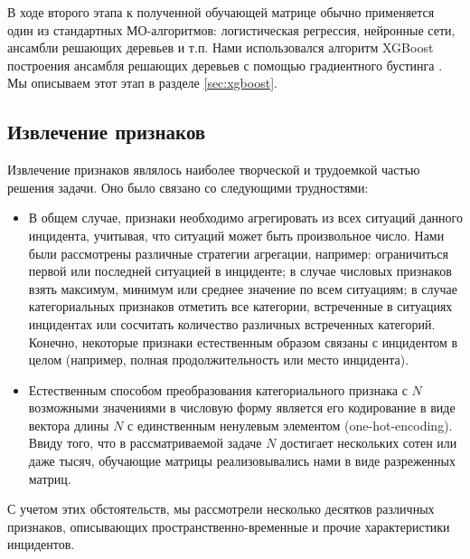 В ходе второго этапа к полученной обучающей матрице обычно применяется один из стандартных МО-алгоритмов: логистическая регрессия, нейронные сети, ансамбли решающих деревьев и т.п. Нами использовался алгоритм XGBoost построения ансамбля решающих деревьев с помощью градиентного бустинга \cite{chen2016xgboost}. Мы описываем этот этап в разделе \ref{sec:xgboost}.  

\subsection{Извлечение признаков}\label{sec:feature_extraction}
Извлечение признаков являлось наиболее творческой и трудоемкой частью решения задачи. Оно было связано со следующими трудностями:
\begin{itemize}
\item В общем случае, признаки необходимо агрегировать из всех ситуаций данного инцидента, учитывая, что ситуаций может быть произвольное число. Нами были рассмотрены различные стратегии агрегации, например: ограничиться первой или последней ситуацией в инциденте; в случае числовых признаков взять максимум, минимум или среднее значение по всем ситуациям; в случае категориальных признаков отметить все категории, встреченные в ситуациях инцидентах или сосчитать количество различных встреченных категорий. Конечно, некоторые признаки естественным образом связаны с инцидентом в целом (например, полная продолжительность или место инцидента).
\item Естественным способом преобразования категориального признака с $N$ возможными значениями в числовую форму является его кодирование в виде вектора длины $N$ с единственным ненулевым элементом (one-hot-encoding). Ввиду того, что в рассматриваемой задаче $N$ достигает нескольких сотен или даже тысяч,  обучающие матрицы реализовывались нами в виде разреженных матриц.    
\end{itemize}
С учетом этих обстоятельств, мы рассмотрели несколько десятков различных признаков, описывающих пространственно-временные и прочие характеристики инцидентов. 

